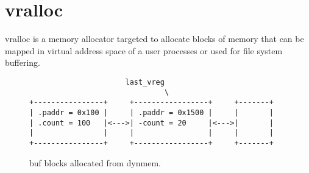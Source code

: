 \chapter{vralloc}

\acf{vralloc} is a memory allocator targeted to allocate blocks of memory
that can be mapped in virtual address space of a user processes or used for
file system buffering.

\begin{figure}
\begin{verbatim}
                      last_vreg
                               \
+----------------+     +-----------------+     +-------+
| .paddr = 0x100 |     | .paddr = 0x1500 |     |       |
| .count = 100   |<--->| -count = 20     |<--->|       |
|                |     |                 |     |       |
+----------------+     +-----------------+     +-------+
\end{verbatim}
\caption{buf blocks allocated from dynmem.}
\label{figure:vralloc_blocks}
\end{figure}
